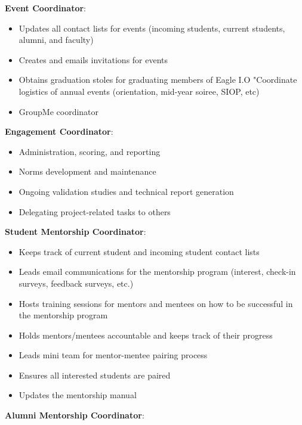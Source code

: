 \documentclass[
]{book}
\providecommand{\tightlist}{%
  \setlength{\itemsep}{0pt}\setlength{\parskip}{0pt}}
\begin{document}
\textbf{Event Coordinator}:

\begin{itemize}
\tightlist
\item
  Updates all contact lists for events (incoming students, current students, alumni, and faculty)
\item
  Creates and emails invitations for events
\item
  Obtains graduation stoles for graduating members of Eagle I.O "Coordinate logistics of annual events (orientation, mid-year soiree, SIOP, etc)
\item
  GroupMe coordinator
\end{itemize}

\textbf{Engagement Coordinator}:

\begin{itemize}
\tightlist
\item
  Administration, scoring, and reporting
\item
  Norms development and maintenance
\item
  Ongoing validation studies and technical report generation\\
\item
  Delegating project-related tasks to others
\end{itemize}

\textbf{Student Mentorship Coordinator}:

\begin{itemize}
\tightlist
\item
  Keeps track of current student and incoming student contact lists
\item
  Leads email communications for the mentorship program (interest, check-in surveys, feedback surveys, etc.)\\
\item
  Hosts training sessions for mentors and mentees on how to be successful in the mentorship program
\item
  Holds mentors/mentees accountable and keeps track of their progress\\
\item
  Leads mini team for mentor-mentee pairing process
\item
  Ensures all interested students are paired\\
\item
  Updates the mentorship manual
\end{itemize}

\textbf{Alumni Mentorship Coordinator}:
\end{document}
